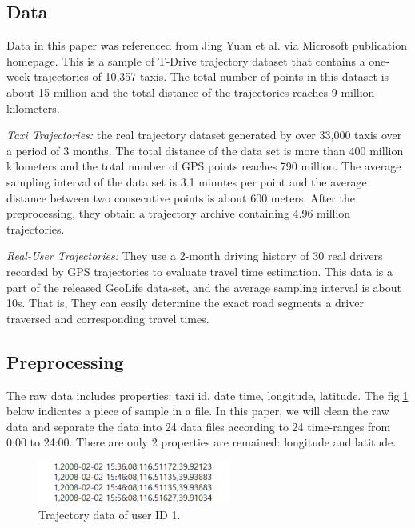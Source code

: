 \documentclass[journal]{IEEEtran}
\begin{document}
\subsection{Data}
Data in this paper was referenced from Jing Yuan et al. \cite{zheng2011t-drive} via Microsoft publication homepage. This is a sample of T-Drive trajectory dataset that contains a one-week trajectories of 10,357 taxis. The total number of points in this dataset is about 15 million and the total distance of the trajectories reaches 9 million kilometers\cite{10.1145/1869790.1869807}\cite{10.1145/2020408.2020462}.

\textit{Taxi Trajectories:} the real trajectory dataset generated by over 33,000 taxis over a period of 3 months. The total distance of the data set is more than 400 million kilometers and the total number of GPS points reaches 790 million. The average sampling interval of the data set is 3.1 minutes per point and the average distance between two consecutive points is about 600 meters. After the preprocessing, they obtain a trajectory archive containing 4.96 million trajectories. 

\textit{Real-User Trajectories:} They use a 2-month driving history of 30 real drivers recorded by GPS trajectories to evaluate travel time estimation. This data is a part of the released GeoLife data-set\cite{10.1145/1367497.1367532}\cite{10.1145/1409635.1409677}, and the average sampling interval is about 10s. That is, They can easily determine the exact road segments a driver traversed and corresponding travel times.

\subsection{Preprocessing}
The raw data includes properties: taxi id, date time, longitude, latitude. The fig.\ref{fig_rawdata} below indicates a piece of sample in a file. In this paper, we will clean the raw data and separate the data into 24 data files according to 24 time-ranges from 0:00 to 24:00. There are only 2 properties are remained: longitude and latitude.
\begin{figure}[!t]
	\centering
	\includegraphics[width=2.5in]{image/rawdata01.png}
	\caption{Trajectory data of user ID 1.}
	\label{fig_rawdata}
\end{figure}
\end{document}
